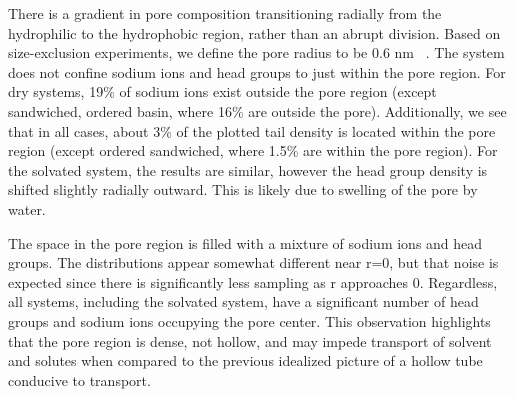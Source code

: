 \documentclass[journal=jpcbfk,manuscript=article]{achemso}
\begin{document}
  There is a gradient in pore composition transitioning radially from the hydrophilic 
  to the hydrophobic region, rather than an abrupt division. Based on size-exclusion 
  experiments, we define the pore radius to be 0.6 nm
  ~\cite{zhou_supported_2005}. The system does not confine
  sodium ions and head groups to just within the pore region. For dry systems,
  19\% of sodium ions exist outside the pore region (except sandwiched, ordered basin,
  where 16\% are outside the pore). Additionally, we see that in all cases, about 
  3\% of the plotted tail density is located within the pore region (except ordered sandwiched,
  where 1.5\% are within the pore region). For the solvated system, the results are similar,
  however the head group density is shifted slightly radially outward. This is likely due to
  swelling of the pore by water. 
  

  The space in the pore region is filled with a mixture of sodium ions
  and head groups. The distributions appear somewhat different near r=0, but that noise 
  is expected since there is significantly less sampling as r approaches 0. Regardless, 
  all systems, including the solvated system, have a significant number of head groups 
  and sodium ions occupying the pore center. This observation highlights that the pore
  region is dense, not hollow, and may impede transport of solvent and solutes when
  compared to the previous idealized picture of a hollow tube conducive to transport.
  
\end{document}

